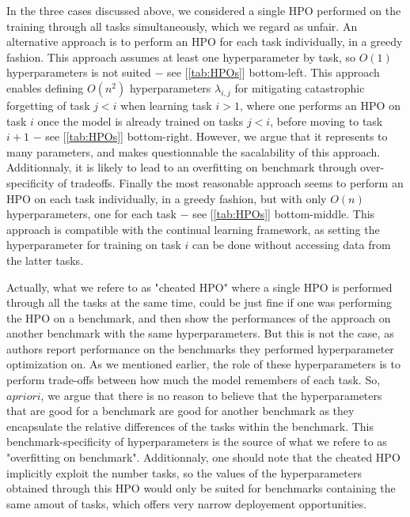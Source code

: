 \documentclass[twocolumn]{article}
\begin{document}
\vspace{1mm}
\noindent
In the three cases discussed above, we considered a single HPO performed on the training through all tasks simultaneously, which we regard as unfair. An alternative approach is to perform an HPO for each task individually, in a greedy fashion. This approach assumes at least one hyperparameter by task, so $O(1)$ hyperparameters is not suited $-$ see [\ref{tab:HPOs}] bottom-left. This approach enables defining $O(n^2)$ hyperparameters $\lambda_{i,j}$ for mitigating catastrophic forgetting of task $j<i$ when learning task $i>1$, where one performs an HPO on task $i$ once the model is already trained on tasks $j<i$, before moving to task $i+1$ $-$ see [\ref{tab:HPOs}] bottom-right. However, we argue that it represents to many parameters, and makes questionnable the sacalability of this approach. Additionnaly, it is likely to lead to an overfitting on benchmark through over-specificity of tradeoffs. Finally the most reasonable approach seems to perform an HPO on each task individually, in a greedy fashion, but with only $O(n)$ hyperparameters, one for each task $-$ see [\ref{tab:HPOs}] bottom-middle. This approach is compatible with the continual learning framework, as setting the hyperparameter for training on task $i$ can be done without accessing data from the latter tasks.

\vspace{1mm}
\noindent
Actually, what we refere to as "cheated HPO" where a single HPO is performed through all the tasks at the same time, could be just fine if one was performing the HPO on a benchmark, and then show the performances of the approach on another benchmark with the same hyperparameters. But this is not the case, as authors report performance on the benchmarks they performed hyperparameter optimization on. As we mentioned earlier, the role of these hyperparameters is to perform trade-offs between how much the model remembers of each task. So, $a priori$, we argue that there is no reason to believe that the hyperparameters that are good for a benchmark are good for another benchmark as they encapsulate the relative differences of the tasks within the benchmark. This benchmark-specificity of hyperparameters is the source of what we refere to as "overfitting on benchmark". Additionnaly, one should note that the cheated HPO implicitly exploit the number tasks, so the values of the hyperparameters obtained through this HPO would only be suited for benchmarks containing the same amout of tasks, which offers very narrow deployement opportunities. 
\end{document}
